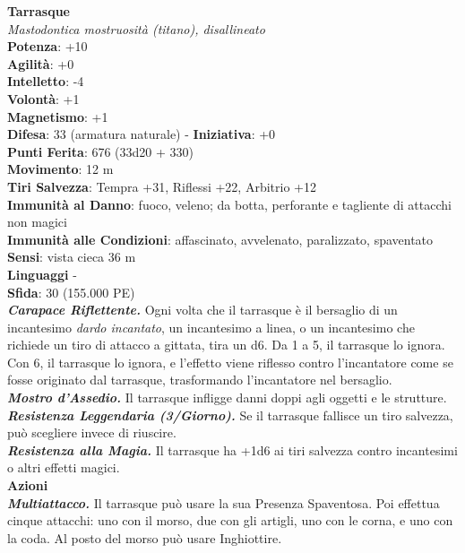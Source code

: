 \begin{multicols}{2}
\medskip\textbf{Tarrasque}\\
\emph{Mastodontica mostruosità (titano), disallineato}\\
\textbf{Potenza}: +10\\
\textbf{Agilità}: +0\\
\textbf{Intelletto}: -4\\
\textbf{Volontà}: +1\\
\textbf{Magnetismo}: +1\\
\textbf{Difesa}: 33 (armatura naturale) - \textbf{Iniziativa}: +0\\
\textbf{Punti Ferita}: 676 (33d20 + 330)\\
\textbf{Movimento}: 12 m\\
\textbf{Tiri Salvezza}: Tempra +31, Riflessi +22, Arbitrio +12\\
\textbf{Immunità al Danno}: fuoco, veleno; da botta, perforante e tagliente di attacchi non magici\\
\textbf{Immunità alle Condizioni}: affascinato, avvelenato, paralizzato, spaventato\\
\textbf{Sensi}: vista cieca 36 m \\
\textbf{Linguaggi} -\\
\textbf{Sfida}: 30 (155.000 PE)\smallskip\\
\emph{\textbf{Carapace Riflettente.}} Ogni volta che il tarrasque è il bersaglio di un incantesimo \emph{dardo incantato}, un incantesimo a linea, o un incantesimo che richiede un tiro di attacco a gittata, tira un d6. Da 1 a 5, il tarrasque lo ignora. Con 6, il tarrasque lo ignora, e l'effetto viene riflesso contro l'incantatore come se fosse originato dal tarrasque, trasformando l'incantatore nel bersaglio. \\
\emph{\textbf{Mostro d'Assedio.}} Il tarrasque infligge danni doppi agli oggetti e le strutture.\\
\emph{\textbf{Resistenza Leggendaria (3/Giorno).}} Se il tarrasque fallisce un tiro salvezza, può scegliere invece di riuscire.\\
\emph{\textbf{Resistenza alla Magia.}} Il tarrasque ha +1d6 ai tiri salvezza contro incantesimi o altri effetti magici.\\
\smallskip\textbf{Azioni}\\
\emph{\textbf{Multiattacco.}} Il tarrasque può usare la sua Presenza Spaventosa. Poi effettua cinque attacchi: uno con il morso, due con gli artigli, uno con le corna, e uno con la coda. Al posto del morso può usare Inghiottire.\\

\end{multicols}
